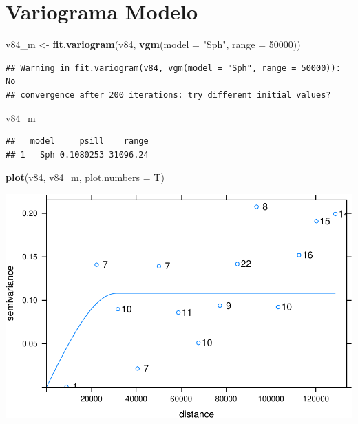 \documentclass[11pt,]{article}
\newenvironment{Shaded}{\begin{snugshade}}{\end{snugshade}}
\newcommand{\KeywordTok}[1]{\textcolor[rgb]{0.13,0.29,0.53}{\textbf{#1}}}
\newcommand{\DataTypeTok}[1]{\textcolor[rgb]{0.13,0.29,0.53}{#1}}
\newcommand{\DecValTok}[1]{\textcolor[rgb]{0.00,0.00,0.81}{#1}}
\newcommand{\StringTok}[1]{\textcolor[rgb]{0.31,0.60,0.02}{#1}}
\newcommand{\NormalTok}[1]{#1}
\begin{document}
\section{Variograma Modelo}\label{variograma-modelo}

\begin{Shaded}
\begin{Highlighting}[]
\NormalTok{v84_m <-}\StringTok{ }\KeywordTok{fit.variogram}\NormalTok{(v84, }\KeywordTok{vgm}\NormalTok{(}\DataTypeTok{model =} \StringTok{"Sph"}\NormalTok{, }\DataTypeTok{range =} \DecValTok{50000}\NormalTok{))}
\end{Highlighting}
\end{Shaded}

\begin{verbatim}
## Warning in fit.variogram(v84, vgm(model = "Sph", range = 50000)): No
## convergence after 200 iterations: try different initial values?
\end{verbatim}

\begin{Shaded}
\begin{Highlighting}[]
\NormalTok{v84_m}
\end{Highlighting}
\end{Shaded}

\begin{verbatim}
##   model     psill    range
## 1   Sph 0.1080253 31096.24
\end{verbatim}

\begin{Shaded}
\begin{Highlighting}[]
\KeywordTok{plot}\NormalTok{(v84, v84_m, }\DataTypeTok{plot.numbers =}\NormalTok{ T)}
\end{Highlighting}
\end{Shaded}

\includegraphics{proyecto_files/figure-latex/unnamed-chunk-36-1.pdf}
\end{document}

